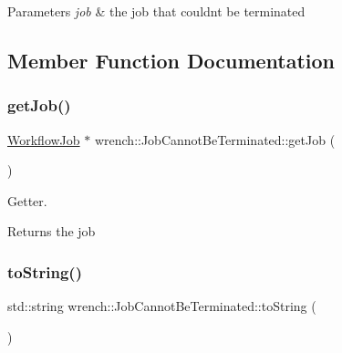 \begin{DoxyParams}{Parameters}
{\em job} & the job that couldn\textquotesingle{}t be terminated \\
\hline
\end{DoxyParams}


\subsection{Member Function Documentation}
\mbox{\label{classwrench_1_1_job_cannot_be_terminated_af97232722e1b4feed0c12b9e0ced666f}} 
\subsubsection{\texorpdfstring{get\+Job()}{getJob()}}
{\footnotesize\ttfamily \hyperlink{classwrench_1_1_workflow_job}{Workflow\+Job} $\ast$ wrench\+::\+Job\+Cannot\+Be\+Terminated\+::get\+Job (\begin{DoxyParamCaption}{ }\end{DoxyParamCaption})}



Getter. 

\begin{DoxyReturn}{Returns}
the job 
\end{DoxyReturn}
\mbox{\label{classwrench_1_1_job_cannot_be_terminated_acfa2b83db93bb68e0e773cc8b4a45505}} 
\subsubsection{\texorpdfstring{to\+String()}{toString()}}
{\footnotesize\ttfamily std\+::string wrench\+::\+Job\+Cannot\+Be\+Terminated\+::to\+String (\begin{DoxyParamCaption}{ }\end{DoxyParamCaption})\hspace{0.3cm}{\ttfamily [virtual]}}



